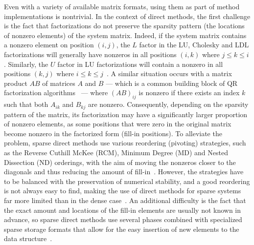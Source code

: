 Even with a variety of available matrix formats, using them as part of method
implementations is nontrivial. In the context of direct methods, the first
challenge is the fact that factorizations do not preserve the sparsity pattern
(\ie the locations of nonzero elements) of the system matrix. Indeed, if the
system matrix contains a nonzero element on position $(i, j)$, the $L$
factor in the LU, Cholesky and LDL factorizations will generally have nonzeros
in all positions $(i, k)$ where $j \leq k \leq i$. Similarly, the $U$ factor in
LU factorizations will contain a nonzero in all positions $(k, j)$ where $i
\leq k \leq j$~\cite{duff}. A similar situation occurs with a matrix product
$AB$ of matrices $A$ and $B$ --- which is a common building block of QR
factorization algorithms~\cite{demmel} --- where $(AB)_{ij}$ is nonzero if there
exists an index $k$ such that both $A_{ik}$ and $B_{kj}$ are nonzero.
Consequently, depending on the sparsity pattern of the matrix, its
factorization may have a significantly larger proportion of nonzero elements, as
some positions that were zero in the original matrix become nonzero in the
factorized form (fill-in positions). To alleviate the problem, sparse direct
methods use various reordering (pivoting) strategies, such as the Reverse
Cuthill McKee (RCM), Minimum Degree (MD) and Nested Dissection (ND) orderings,
with the aim of moving the nonzeros closer to the diagonals and thus reducing
the amount of fill-in~\cite{saad, duff}. However, the strategies have to be
balanced with the preservation of numerical stability, and a good reordering is
not always easy to find, making the use of direct methods for sparse systems far
more limited than in the dense case~\cite{saad, duff}. An additional difficulty
is the fact that the exact amount and locations of the fill-in elements are
usually not known in advance, so sparse direct methods use several phases
\eq{:-)}
combined with specialized sparse storage formats that allow for the easy
insertion of new elements to the data structure~\cite{saad, duff}.

